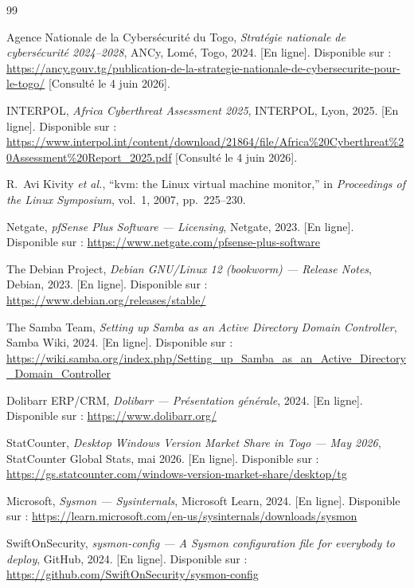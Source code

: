 \documentclass[12pt,a4paper]{article}
\begin{document}
\begin{thebibliography}{99}

Agence Nationale de la Cybersécurité du Togo,
\textit{Stratégie nationale de cybersécurité 2024--2028},
ANCy, Lomé, Togo, 2024.
[En ligne]. Disponible sur :
\url{https://ancy.gouv.tg/publication-de-la-strategie-nationale-de-cybersecurite-pour-le-togo/}
[Consulté le 4 juin 2026].

INTERPOL,
\textit{Africa Cyberthreat Assessment 2025},
INTERPOL, Lyon, 2025.
[En ligne]. Disponible sur :
\url{https://www.interpol.int/content/download/21864/file/Africa%20Cyberthreat%20Assessment%20Report_2025.pdf}
[Consulté le 4 juin 2026].

R.~Avi Kivity \textit{et al.},
``kvm: the Linux virtual machine monitor,''
in \textit{Proceedings of the Linux Symposium}, vol.~1, 2007, pp.~225--230.

Netgate,
\textit{pfSense Plus Software --- Licensing},
Netgate, 2023.
[En ligne]. Disponible sur :
\url{https://www.netgate.com/pfsense-plus-software}

The Debian Project,
\textit{Debian GNU/Linux 12 (bookworm) --- Release Notes},
Debian, 2023.
[En ligne]. Disponible sur :
\url{https://www.debian.org/releases/stable/}

The Samba Team,
\textit{Setting up Samba as an Active Directory Domain Controller},
Samba Wiki, 2024.
[En ligne]. Disponible sur :
\url{https://wiki.samba.org/index.php/Setting_up_Samba_as_an_Active_Directory_Domain_Controller}

Dolibarr ERP/CRM,
\textit{Dolibarr --- Présentation générale},
2024.
[En ligne]. Disponible sur :
\url{https://www.dolibarr.org/}

StatCounter,
\textit{Desktop Windows Version Market Share in Togo --- May 2026},
StatCounter Global Stats, mai 2026.
[En ligne]. Disponible sur :
\url{https://gs.statcounter.com/windows-version-market-share/desktop/tg}

Microsoft,
\textit{Sysmon --- Sysinternals},
Microsoft Learn, 2024.
[En ligne]. Disponible sur :
\url{https://learn.microsoft.com/en-us/sysinternals/downloads/sysmon}

SwiftOnSecurity,
\textit{sysmon-config --- A Sysmon configuration file for everybody to deploy},
GitHub, 2024.
[En ligne]. Disponible sur :
\url{https://github.com/SwiftOnSecurity/sysmon-config}


\end{thebibliography}
\end{document}
